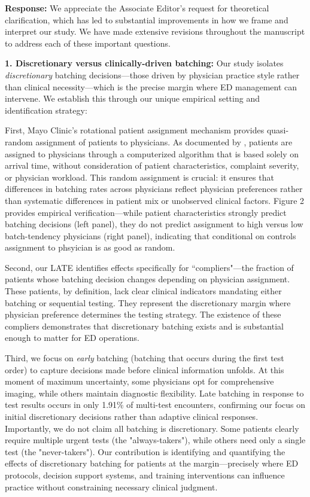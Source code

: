 \documentclass[11pt]{article}
\newcommand{\1}{\hbox{\rm 1\kern-.35em 1}}
\begin{document}
\noindent\textbf{Response:} 
\color{blue}
We appreciate the Associate Editor's request for theoretical clarification, which has led to substantial improvements in how we frame and interpret our study. We have made extensive revisions throughout the manuscript to address each of these important questions.

\textbf{1. Discretionary versus clinically-driven batching:} Our study isolates \textit{discretionary} batching decisions—those driven by physician practice style rather than clinical necessity—which is the precise margin where ED management can intervene. We establish this through our unique empirical setting and identification strategy:

First, Mayo Clinic's rotational patient assignment mechanism provides quasi-random assignment of patients to physicians. As documented by \cite{Traub2016; traub2016emergency; Traub2018}, patients are assigned to physicians through a computerized algorithm that is based solely on arrival time, without consideration of patient characteristics, complaint severity, or physician workload. This random assignment is crucial: it ensures that differences in batching rates across physicians reflect physician preferences rather than systematic differences in patient mix or unobserved clinical factors. Figure 2 provides empirical verification—while patient characteristics strongly predict batching decisions (left panel), they do not predict assignment to high versus low batch-tendency physicians (right panel), indicating that conditional on controls assignment to phsyician is as good as random.

Second, our LATE identifies effects specifically for ``compliers"—the fraction of patients whose batching decision changes depending on physician assignment. These patients, by definition, lack clear clinical indicators mandating either batching or sequential testing. They represent the discretionary margin where physician preference determines the testing strategy. The existence of these compliers demonstrates that discretionary batching exists and is substantial enough to matter for ED operations.

Third, we focus on \textit{early} batching (batching that occurs during the first test order) to capture decisions made before clinical information unfolds. At this moment of maximum uncertainty, some physicians opt for comprehensive imaging, while others maintain diagnostic flexibility. Late batching in response to test results occurs in only 1.91\% of multi-test encounters, confirming our focus on initial discretionary decisions rather than adaptive clinical responses.
Importantly, we do not claim all batching is discretionary. Some patients clearly require multiple urgent tests (the "always-takers"), while others need only a single test (the "never-takers"). Our contribution is identifying and quantifying the effects of discretionary batching for patients at the margin—precisely where ED protocols, decision support systems, and training interventions can influence practice without constraining necessary clinical judgment.
\end{document}

